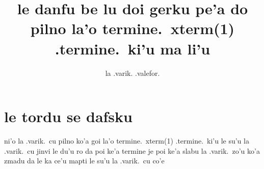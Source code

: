 \documentclass{article}
\title{le danfu be lu doi gerku pe'a do pilno la'o termine.\ xterm(1) .termine.\ ki'u ma li'u}
\author{la .varik. .valefor.}
\begin{document}
\maketitle

\section{le tordu se dafsku}
ni'o la .varik.\ cu pilno ko'a goi la'o termine.\ xterm(1) .termine.\ ki'u le su'u la .varik.\ cu jinvi le du'u ro da poi ke'a termine je poi ke'a slabu la .varik.\ zo'u ko'a zmadu da le ka ce'u mapti le su'u la .varik.\ cu co'e
\end{document}
